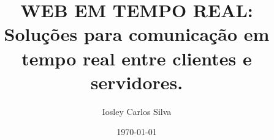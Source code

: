 \documentclass[
	article,
    a4paper,
    12pt,
    oneside,
    english,			%
    brazil
]{abntex2}
\title{WEB EM TEMPO REAL: Soluções para comunicação em tempo real entre clientes e servidores.}
\author{Iosley Carlos Silva}
\date{\today}
\begin{document}
	
\maketitle














{
	\clearpage
	
}


{
	\clearpage
	\listoffigures
}
\end{document}
